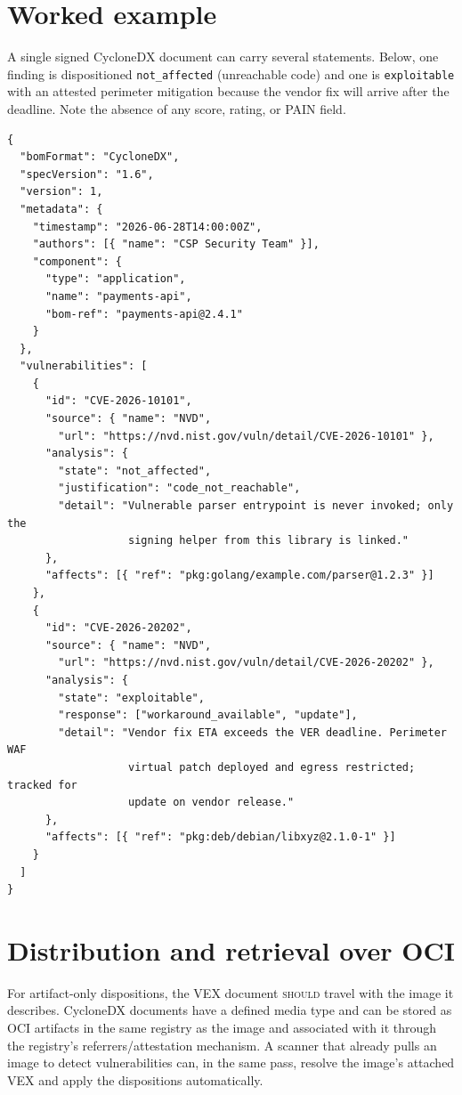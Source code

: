 \documentclass[11pt]{article}
\newcommand{\code}[1]{\texttt{#1}}
\newcommand{\rfckw}[1]{\textsc{#1}}
\begin{document}
\section{Worked example}
A single signed CycloneDX document can carry several statements. Below, one finding is
dispositioned \code{not\_affected} (unreachable code) and one is \code{exploitable} with
an attested perimeter mitigation because the vendor fix will arrive after the deadline.
Note the absence of any score, rating, or PAIN field.

\begin{lstlisting}[style=json]
{
  "bomFormat": "CycloneDX",
  "specVersion": "1.6",
  "version": 1,
  "metadata": {
    "timestamp": "2026-06-28T14:00:00Z",
    "authors": [{ "name": "CSP Security Team" }],
    "component": {
      "type": "application",
      "name": "payments-api",
      "bom-ref": "payments-api@2.4.1"
    }
  },
  "vulnerabilities": [
    {
      "id": "CVE-2026-10101",
      "source": { "name": "NVD",
        "url": "https://nvd.nist.gov/vuln/detail/CVE-2026-10101" },
      "analysis": {
        "state": "not_affected",
        "justification": "code_not_reachable",
        "detail": "Vulnerable parser entrypoint is never invoked; only the
                   signing helper from this library is linked."
      },
      "affects": [{ "ref": "pkg:golang/example.com/parser@1.2.3" }]
    },
    {
      "id": "CVE-2026-20202",
      "source": { "name": "NVD",
        "url": "https://nvd.nist.gov/vuln/detail/CVE-2026-20202" },
      "analysis": {
        "state": "exploitable",
        "response": ["workaround_available", "update"],
        "detail": "Vendor fix ETA exceeds the VER deadline. Perimeter WAF
                   virtual patch deployed and egress restricted; tracked for
                   update on vendor release."
      },
      "affects": [{ "ref": "pkg:deb/debian/libxyz@2.1.0-1" }]
    }
  ]
}
\end{lstlisting}

\section{Distribution and retrieval over OCI}
For artifact-only dispositions, the VEX document \rfckw{should} travel with the image it
describes. CycloneDX documents have a defined media type and can be stored as OCI
artifacts in the same registry as the image and associated with it through the registry's
referrers/attestation mechanism. A scanner that already pulls an image to detect
vulnerabilities can, in the same pass, resolve the image's attached VEX and apply the
dispositions automatically.
\end{document}
